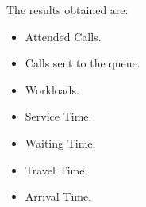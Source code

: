 The results obtained are:
\begin{itemize}
\item Attended Calls.
\item Calls sent to the queue.
\item Workloads.
\item Service Time.
\item Waiting Time.
\item Travel Time.
\item Arrival Time.
\end{itemize}
